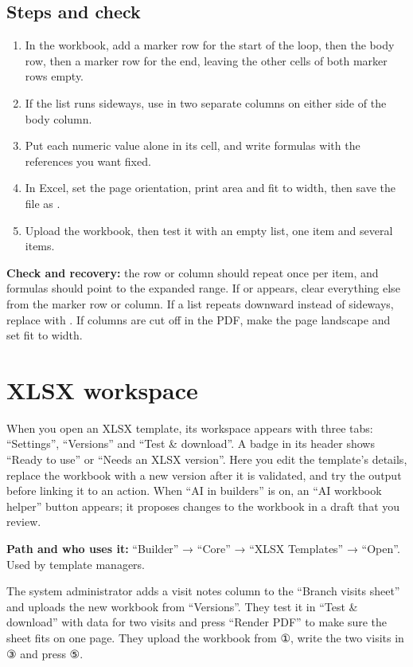 \subsection{Steps and check}
\begin{enumerate}
\item In the workbook, add a marker row for the start of the loop, then the body row, then a marker row for the end, leaving the other cells of both marker rows empty.
\item If the list runs sideways, use  in two separate columns on either side of the body column.
\item Put each numeric value alone in its cell, and write formulas with the references you want fixed.
\item In Excel, set the page orientation, print area and fit to width, then save the file as .
\item Upload the workbook, then test it with an empty list, one item and several items.
\end{enumerate}

\textbf{Check and recovery:} the row or column should repeat once per item, and formulas should point to the expanded range. If  or  appears, clear everything else from the marker row or column. If a list repeats downward instead of sideways, replace  with . If columns are cut off in the PDF, make the page landscape and set fit to width.

\clearpage
\section{XLSX workspace}
\label{sec:builder-feature-xlsx-workspace}

When you open an XLSX template, its workspace appears with three tabs: “Settings”, “Versions” and “Test \& download”. A badge in its header shows “Ready to use” or “Needs an XLSX version”. Here you edit the template's details, replace the workbook with a new version after it is validated, and try the output before linking it to an action. When “AI in builders” is on, an “AI workbook helper” button appears; it proposes changes to the workbook in a draft that you review.

\textbf{Path and who uses it:} “Builder” → “Core” → “XLSX Templates” → “Open”. Used by template managers.

\begin{rcnote}
The system administrator adds a visit notes column to the “Branch visits sheet” and uploads the new workbook from “Versions”. They test it in “Test \& download” with data for two visits and press “Render PDF” to make sure the sheet fits on one page. They upload the workbook from ①, write the two visits in ③ and press ⑤.
\end{rcnote}


